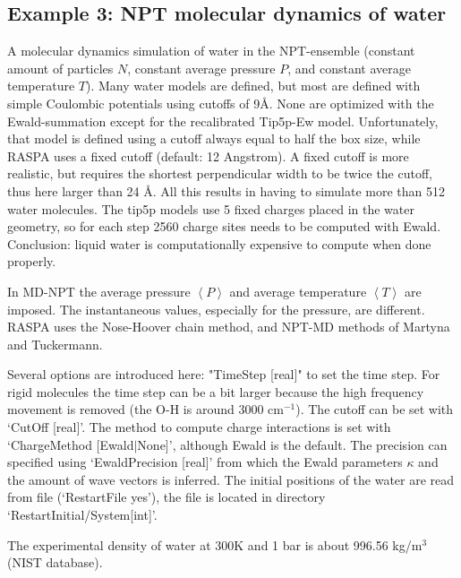 \subsection*{Example 3: NPT molecular dynamics of water}
A molecular dynamics simulation of water in the NPT-ensemble
(constant amount of particles $N$, constant average pressure $P$, and constant average temperature $T$).
Many water models are defined, but most are defined with simple Coulombic potentials using cutoffs of 9\AA.
None are optimized with the Ewald-summation except for the recalibrated Tip5p-Ew model.
Unfortunately, that model is defined using a cutoff always equal to half the box size, while
RASPA uses a fixed cutoff (default: 12 Angstrom). A fixed cutoff is more realistic, but requires the shortest
perpendicular width to be twice the cutoff, thus here larger than 24 \AA. All this results in having
to simulate more than 512 water molecules. The tip5p models use 5 fixed charges placed in the water geometry,
so for each step 2560 charge sites needs to be computed with Ewald. Conclusion: liquid water is computationally
expensive to compute when done properly.

In MD-NPT the average pressure 
$\left\langle P\right\rangle$ and average temperature $\left\langle T\right\rangle$ are imposed. The instantaneous
values, especially for the pressure, are different. RASPA uses the Nose-Hoover chain method, and NPT-MD methods of
Martyna and Tuckermann.

Several options are introduced here: "TimeStep [real]" to set the time step. For rigid molecules the time step can be a bit larger
because the high frequency movement is removed (the O-H is around 3000 cm$^{-1}$). The cutoff can be set with `CutOff [real]'.
The method to compute charge interactions is set with `ChargeMethod [Ewald$|$None]', although Ewald is the default. The precision can specified
using `EwaldPrecision [real]' from which the Ewald parameters $\kappa$ and the amount of wave vectors is inferred.
The initial positions of the water are read from file (`RestartFile yes'), the file is located in directory `RestartInitial/System[int]'.

The experimental density of water at 300K and 1 bar is about 996.56 kg/m$^3$ (NIST database).

